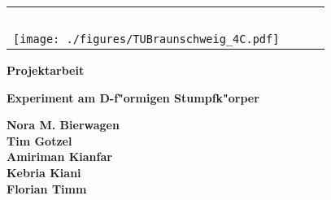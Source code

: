 \begin{titlepage}
 \centering

\begin{table}[htbp]
 \begin{center}
 \vspace{-0.5cm}
  \begin{tabular}{lcr} 
    \parbox{0.45\textwidth}{\mbox{ }} & \parbox{0.13\textwidth}{\mbox{ }} & \parbox{0.45\textwidth}{\mbox{ }} \\
    \hspace*{-2.0cm}
    \texttt{[image: ./figures/TUBraunschweig\_4C.pdf]} & 
     &  \\ %
  \end{tabular}
 \end{center}
\end{table}


 \vspace*{2.0cm}

 \textbf{\large Projektarbeit}


 \vspace*{1.5cm}
 
 \textbf{\LARGE Experiment am D-f"ormigen Stumpfk"orper} \\[0.5ex]
 


 \vspace*{1.5cm}

 \textbf{\large Nora M. Bierwagen} \\
 \textbf{\large Tim Gotzel} \\
 \textbf{\large Amiriman Kianfar} \\
 \textbf{\large Kebria Kiani} \\
 \textbf{\large Florian Timm} \\


 \vspace*{7.0cm}


\end{titlepage}
